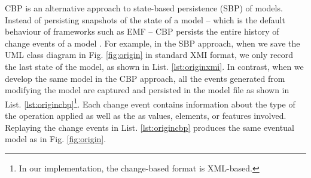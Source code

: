 \documentclass{jot}
\newcommand{\dk}[1]{\textcolor{blue}{\textbf{[Dimitris: #1]}}}
\begin{document}
    \vspace{-5pt}
    CBP is an alternative approach to state-based persistence (SBP) of models. Instead of persisting snapshots of the state of a model -- which is the default behaviour of frameworks such as EMF -- CBP persists the entire history of change events of a model \cite{yohannis2018towards}. For example, in the SBP approach, when we save the UML class diagram in Fig. \ref{fig:origin} in standard XMI format, we only record the last state of the model, as shown in List. \ref{lst:originxmi}. In contrast, when we develop the same model in the CBP approach, all the  events generated from modifying the model are captured and persisted in the model file as shown in List. \ref{lst:origincbp}\footnote{In our implementation, the change-based format is XML-based.}. 
    Each change event contains information about the type of the operation applied as well as the as values, elements, or features involved. Replaying the change events in List. \ref{lst:origincbp} produces the same eventual model as in Fig. \ref{fig:origin}.
    
\end{document}
